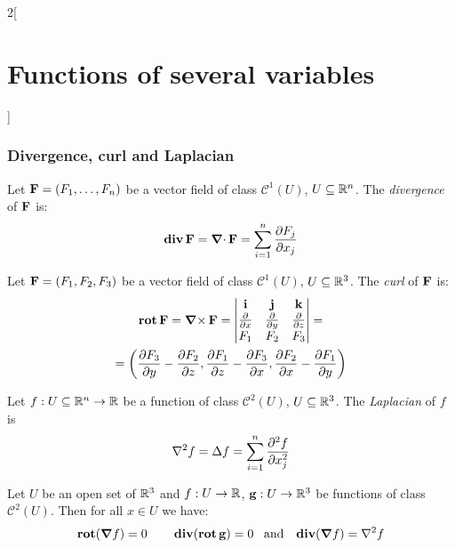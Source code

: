 \documentclass[../../../main.tex]{subfiles}
\begin{document}
\begin{multicols}{2}[\section{Functions of several variables}]
  \subsubsection{Divergence, curl and Laplacian}
  \begin{definition}
    Let $\boldsymbol{\mathrm{F}}=(F_1,\ldots, F_n)$ be a vector field of class $\mathcal{C}^1(U)$, $U\subseteq\mathbb{R}^n$. The \emph{divergence} of $\boldsymbol{\mathrm{F}}$ is: $$\operatorname{\boldsymbol{\mathrm{div}}}\boldsymbol{\mathrm{F}}=\operatorname{\boldsymbol{\mathrm{\nabla}}\cdot}\boldsymbol{\mathrm{F}}=\sum_{i=1}^n\frac{\partial F_j}{\partial x_j}$$
  \end{definition}
  \begin{definition}
    Let $\boldsymbol{\mathrm{F}}=(F_1,F_2,F_3)$ be a vector field of class $\mathcal{C}^1(U)$, $U\subseteq\mathbb{R}^3$. The \emph{curl} of $\boldsymbol{\mathrm{F}}$ is:
    \begin{multline*}
      \operatorname{\boldsymbol{\mathrm{rot}}}\boldsymbol{\mathrm{F}}=\operatorname{\boldsymbol{\mathrm{\nabla}}\times}\boldsymbol{\mathrm{F}}=
      \begin{vmatrix}
        \boldsymbol{\mathrm{i}}                      & \boldsymbol{\mathrm{j}}                      & \boldsymbol{\mathrm{k}}                      \\
        \frac{\partial}{\partial x} & \frac{\partial}{\partial y} & \frac{\partial}{\partial z} \\
        F_1                         & F_2                         & F_3                         \\
      \end{vmatrix}=\\=\left(\frac{\partial F_3}{\partial y}-\frac{\partial F_2}{\partial z},\frac{\partial F_1}{\partial z}-\frac{\partial F_3}{\partial x},\frac{\partial F_2}{\partial x}-\frac{\partial F_1}{\partial y}\right)
    \end{multline*}
  \end{definition}
  \begin{definition}\label{FOSV_laplacian}
    Let $f:U\subseteq\mathbb{R}^n\rightarrow\mathbb{R} $ be a function of class $\mathcal{C}^2(U)$, $U\subseteq\mathbb{R}^3$. The \emph{Laplacian} of $f$ is $$\laplacian f=\Delta f=\sum_{i=1}^n\frac{\partial^2 f}{\partial x_j^2}$$
  \end{definition}
  \begin{proposition}
    Let $U$ be an open set of $\mathbb{R}^3$ and $f:U\rightarrow\mathbb{R} $, $\boldsymbol{\mathrm{g}}:U\rightarrow\mathbb{R}^3$ be functions of class $\mathcal{C}^2(U)$. Then for all $x\in U$ we have: $$\rot(\grad f)=0\qquad\div(\rot\vf{g})=0\;\;\;\text{and}\;\;\;\div(\grad f)=\laplacian f$$
  \end{proposition}

\end{multicols}
\end{document}
